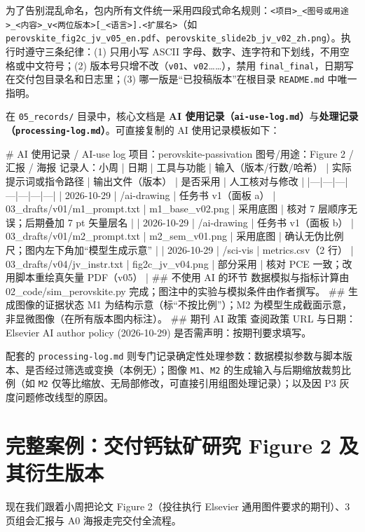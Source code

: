 为了告别混乱命名，包内所有文件统一采用四段式命名规则：\texttt{<项目>\_<图号或用途>\_<内容>\_v<两位版本>[\_<语言>].<扩展名>}（如 \texttt{perovskite\_fig2c\_jv\_v05\_en.pdf}、\texttt{perovskite\_\allowbreak slide2b\_\allowbreak jv\_\allowbreak v02\_\allowbreak zh.png}）。执行时遵守三条纪律：(1) 只用小写 ASCII 字母、数字、连字符和下划线，不用空格或中文符号；(2) 版本号只增不改（\texttt{v01}、\texttt{v02}……），禁用 \texttt{final\_final}，日期写在交付包目录名和日志里；(3) 哪一版是“已投稿版本”在根目录 \texttt{README.md} 中唯一指明。

在 \texttt{05\_records/} 目录中，核心文档是 \textbf{AI 使用记录（\texttt{ai-use-log.md}）}与\textbf{处理记录（\texttt{processing-log.md}）}。可直接复制的 AI 使用记录模板如下：

\begin{Prompt}
# AI 使用记录 / AI-use log
项目：perovskite-passivation   图号/用途：Figure 2 / 汇报 / 海报   记录人：小周
| 日期 | 工具与功能 | 输入（版本/行数/哈希） | 实际提示词或指令路径 | 输出文件（版本） | 是否采用 | 人工核对与修改 |
|---|---|---|---|---|---|---|
| 2026-10-29 | /ai-drawing | 任务书 v1（面板 a） | 03_drafts/v01/m1_prompt.txt | m1_base_v02.png | 采用底图 | 核对 7 层顺序无误；后期叠加 7 pt 矢量层名 |
| 2026-10-29 | /ai-drawing | 任务书 v1（面板 b） | 03_drafts/v01/m2_prompt.txt | m2_sem_v01.png | 采用底图 | 确认无伪比例尺；图内左下角加“模型生成示意” |
| 2026-10-29 | /sci-vis | metrics.csv（2 行） | 03_drafts/v04/jv_instr.txt | fig2c_jv_v04.png | 部分采用 | 核对 PCE 一致；改用脚本重绘真矢量 PDF（v05） |
## 不使用 AI 的环节
数据模拟与指标计算由 02_code/sim_perovskite.py 完成；图注中的实验与模拟条件由作者撰写。
## 生成图像的证据状态
M1 为结构示意（标“不按比例”）；M2 为模型生成截面示意，非显微图像（在所有版本图内标注）。
## 期刊 AI 政策
查阅政策 URL 与日期：Elsevier AI author policy (2026-10-29)   是否需声明：按期刊要求填写。
\end{Prompt}

配套的 \texttt{processing-log.md} 则专门记录确定性处理参数：数据模拟参数与脚本版本、是否经过筛选或变换（本例无）；图像 \texttt{M1}、\texttt{M2} 的生成输入与后期缩放裁剪比例（如 \texttt{M2} 仅等比缩放、无局部修改，可直接引用组图处理记录）；以及因 P3 灰度问题修改线型的原因。

\section{完整案例：交付钙钛矿研究 Figure 2 及其衍生版本}

现在我们跟着小周把论文 Figure 2（投往执行 Elsevier 通用图件要求的期刊）、3 页组会汇报与 A0 海报走完交付全流程。

